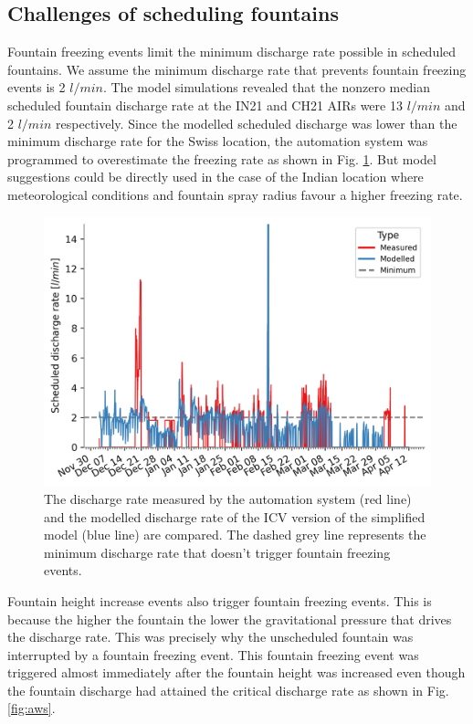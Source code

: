 \documentclass[tc, manuscript]{copernicus}
\begin{document}
\subsection{Challenges of scheduling fountains}

Fountain freezing events limit the minimum discharge rate possible in scheduled fountains.  We assume the
minimum discharge rate that prevents fountain freezing events is 2 $l/min$. The model simulations revealed that
the nonzero median scheduled fountain discharge rate at the IN21 and CH21 AIRs were 13 $l/min$ and 2 $l/min$
respectively. Since the modelled scheduled discharge was lower than the minimum discharge rate for the Swiss
location, the automation system was programmed to overestimate the freezing rate as shown in Fig.
\ref{fig:simvsreal}. But model suggestions could be directly used in the case of the Indian location where
meteorological conditions and fountain spray radius favour a higher freezing rate. 

\begin{figure}[t]
\includegraphics[width=12cm]{Figures/simvsreal.png}

\caption{ The discharge rate measured by the automation system (red line) and the modelled discharge rate of the ICV version
  of the simplified model (blue line) are compared. The dashed grey line represents the minimum discharge rate
that doesn't trigger fountain freezing events. }

\label{fig:simvsreal}
\end{figure}

Fountain height increase events also trigger fountain freezing events. This is because the higher the fountain
the lower the gravitational pressure that drives the discharge rate. This was precisely why the unscheduled
fountain was interrupted by a fountain freezing event. This fountain freezing event was triggered almost
immediately after the fountain height was increased even though the fountain discharge had attained the critical
discharge rate as shown in Fig. \ref{fig:aws}. 
\end{document}
